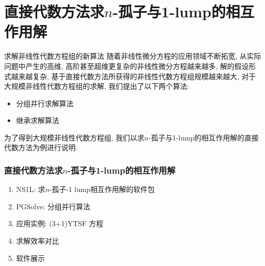 \section{直接代数方法求$n$-孤子与1-lump的相互作用解}
\begin{frame}{求解非线性代数方程组的新算法}
随着非线性微分方程的应用领域不断拓宽, 从实际问题中产生的高维, 高阶甚至超维更复杂的非线性微分方程越来越多, 解的假设形式越来越复杂, 基于直接代数方法所获得的非线性代数方程组规模越来越大, 对于大规模非线性代数方程组的求解, 我们提出了以下两个算法: 

\begin{itemize}
\item 分组并行求解算法  
\item 继承求解算法  
\end{itemize}

为了得到大规模非线性代数方程组, 我们以求$n$-孤子与1-lump的相互作用解的直接代数方法为例进行说明. 
\end{frame}

\begin{frame}
\frametitle{直接代数方法求$n$-孤子与1-lump的相互作用解}
\begin{enumerate}
\item NS1L: 求$n$-孤子-1 lump相互作用解的软件包
\item PGSolve: 分组并行算法
\item 应用实例: (3+1)YTSF 方程
\item 求解效率对比
\item 软件展示 
\end{enumerate}
\end{frame}

